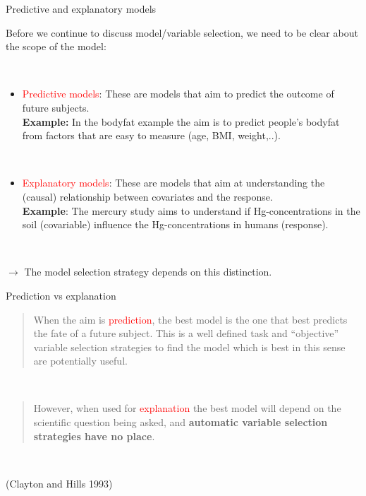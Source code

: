\documentclass[
  10pt,
  ignorenonframetext,
]{beamer}
\providecommand{\tightlist}{%
  \setlength{\itemsep}{0pt}\setlength{\parskip}{0pt}}
\begin{document}
\begin{frame}
\begin{block}{Predictive and explanatory models}
\protect\hypertarget{predictive-and-explanatory-models}{}
\(~\)

Before we continue to discuss model/variable selection, we need to be
clear about the scope of the model:

\(~\)

\begin{itemize}
\tightlist
\item
  \textcolor{red}{Predictive models}: These are models that aim to
  predict the outcome of future subjects.\\
  \textbf{Example:} In the bodyfat example the aim is to predict
  people's bodyfat from factors that are easy to measure (age, BMI,
  weight,..).
\end{itemize}

\(~\)

\begin{itemize}
\tightlist
\item
  \textcolor{red}{Explanatory models}: These are models that aim at
  understanding the (causal) relationship between covariates and the
  response.\\
  \textbf{Example}: The mercury study aims to understand if
  Hg-concentrations in the soil (covariable) influence the
  Hg-concentrations in humans (response).
\end{itemize}

\(~\)

\(\rightarrow\) The model selection strategy depends on this
distinction.
\end{block}
\end{frame}

\begin{frame}
\begin{block}{Prediction vs explanation}
\protect\hypertarget{prediction-vs-explanation}{}
\(~\)

\begin{quote}
When the aim is \textcolor{red}{prediction}, the best model is the one
that best predicts the fate of a future subject. This is a well defined
task and ``objective'' variable selection strategies to find the model
which is best in this sense are potentially useful.
\end{quote}

\(~\)

\begin{quote}
However, when used for \textcolor{red}{explanation} the best model will
depend on the scientific question being asked, and \textbf{automatic
variable selection strategies have no place}.
\end{quote}

\(~\)

\scriptsize (Clayton and Hills 1993)
\end{block}
\end{frame}
\end{document}
